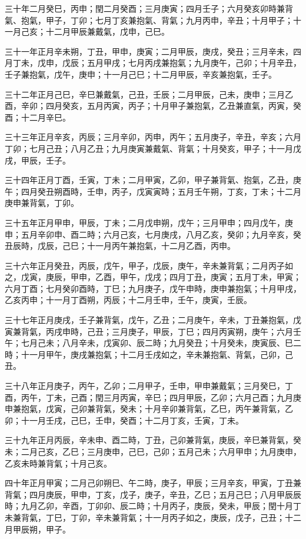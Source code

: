\begin{pinyinscope}
三十年二月癸巳，丙申；閏二月癸酉；三月庚寅；四月壬子；六月癸亥卯時兼背氣、抱氣，甲子，丁卯；七月丁亥兼抱氣、背氣；九月丙申，辛丑；十月甲子；十一月己亥；十二月甲辰兼戴氣，戊申，己巳。

三十一年正月辛未朔，丁丑，甲申，庚寅；二月甲辰，庚戌，癸丑；三月辛未，四月丁未，戊申，戊辰；五月甲戌；七月丙戌兼抱氣；九月庚午，己卯；十月辛丑，壬子兼抱氣，戊午，庚申；十一月己巳；十二月甲辰，辛亥兼抱氣，壬子。

三十二年正月己巳，辛巳兼戴氣，己丑，壬辰；二月甲辰，己未，庚申；三月乙酉，辛卯；四月癸亥，五月丙寅，丙子；十月甲子兼抱氣，乙丑兼直氣，丙寅，癸酉；十二月辛巳。

三十三年正月辛亥，丙辰；三月辛卯，丙申，丙午；五月庚子，辛丑，辛亥；六月丁卯；七月己丑；八月乙丑；九月庚寅兼戴氣、背氣；十月癸亥，甲子；十一月戊戌，甲辰，壬子。

三十四年正月丁酉，壬寅，丁未；二月甲寅，乙卯，甲子兼背氣、抱氣，乙丑，庚午；四月癸丑朔酉時，壬申，丙子，戊寅寅時；五月壬午朔，丁亥，丁未；十二月庚申兼背氣，丁卯。

三十五年正月甲申，甲辰，丁未；二月戊申朔，戊午；三月甲申；四月戊午，庚申；五月辛卯申、酉二時；六月己亥，七月庚戌，八月乙亥，癸卯；九月辛亥，癸丑辰時，戊辰，己巳；十一月丙午兼抱氣，十二月乙酉，丙申。

三十六年正月癸丑，丙辰，戊午，甲子，戊辰，庚午，辛未兼背氣；二月丙子如之，戊寅，庚辰，甲申，乙酉，甲午，戊戌；四月丁丑，庚寅；五月丁未，甲寅；六月丁酉；七月癸卯酉時，丁巳；九月庚子，戊午申時，庚申兼抱氣；十月甲戌，乙亥丙申；十一月丁酉朔，丙辰；十二月壬申，壬午，庚寅，壬辰。

三十七年正月庚戌，壬子兼背氣，戊午，乙丑；二月庚午，辛未，丁丑兼抱氣，戊寅兼背氣，丙戌申時，己丑；三月庚子，甲辰，丁巳；四月丙寅朔，庚午；六月壬午；七月己未；八月辛未，戊寅卯、辰二時；九月癸丑；十月癸未，庚寅辰、巳二時；十一月甲午，庚戌兼抱氣；十二月壬戌如之，辛未兼抱氣、背氣，己卯，己丑。

三十八年正月庚子，丙午，乙卯；二月甲子，壬申，甲申兼戴氣；三月癸巳，丁酉，丙午，丁未，己酉；閏三月丙寅，辛巳；四月甲辰，乙卯；六月己酉；九月庚申兼抱氣，戊寅，己卯兼背氣，癸未；十月辛卯兼背氣，乙巳，丙午兼背氣，乙卯；十一月壬戌，己巳，壬申，癸酉；十二月丁亥，壬寅，丁未。

三十九年正月丙辰，辛未申、酉二時，丁丑，己卯兼背氣，庚辰，辛巳兼背氣，癸未；二月己亥，乙巳；三月庚申，己巳，己卯；五月己未；六月甲申；九月庚申，乙亥未時兼背氣；十月己亥。

四十年正月甲寅；二月己卯朔巳、午二時，庚子，甲辰；三月辛亥，甲寅，丁丑兼背氣；四月庚辰，甲申，丁亥，戊子，庚子，辛丑，乙巳；五月己巳；八月甲辰辰時；九月乙卯，辛酉，丁卯卯、辰二時；十月丙子，庚辰，癸未，甲辰；閏十月丁未兼背氣，丁巳，丁卯，辛未兼背氣；十一月丙子如之，庚辰，戊子，己丑；十二月甲辰朔，甲子。


\end{pinyinscope}
